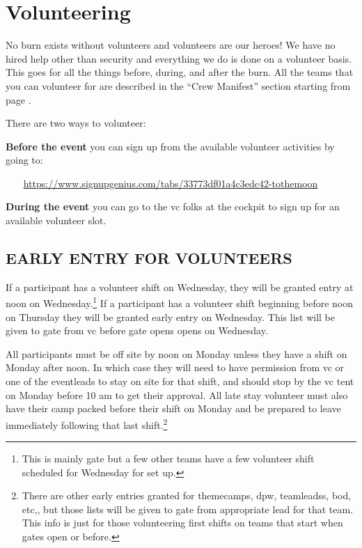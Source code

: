 %
%
%

\chapter{Volunteering}
\label{ch:volunteering}


No burn exists without volunteers and volunteers are our heroes! We have no hired help other than security and everything we do is done on a volunteer basis.  This goes for all the things before, during, and after the burn.  All the teams that you can volunteer for are described in the ``Crew Manifest'' section starting from page \pageref{ch:teams}.

There are two ways to volunteer:

\textbf{Before the event} you can sign up from the available volunteer activities by going to:

{\indent ~~~ \url{https://www.signupgenius.com/tabs/33773df01a4c3edc42-tothemoon} }

\textbf{During the event} you can go to the \gls{vc} folks at the \gls{cockpit} to sign up for an available volunteer slot.

\section*{EARLY ENTRY FOR VOLUNTEERS}

If a participant has a volunteer shift on Wednesday, they will be granted entry at noon on Wednesday.\footnote{This is mainly \gls{gate} but a few other teams have a few volunteer shift scheduled for Wednesday for set up.}  If a participant has a volunteer shift beginning before noon on Thursday they will be granted early entry on Wednesday.  This list will be given to \gls{gate} from \gls{vc} before \gls{gate} opens opens on Wednesday.

All participants must be off site by noon on Monday unless they have a shift on Monday after noon. In which case they will need to have permission from \gls{vc} or one of the \gls{eventleads} to stay on site for that shift, and should stop by the \gls{vc} tent on Monday before 10 am to get their approval. All late stay volunteer must also have their camp packed before their shift on Monday and be prepared to leave immediately following that last shift.\footnote{There are other early entries granted for \glspl{themecamp}, \gls{dpw}, \glspl{teamleads}, \gls{bod}, etc,,  but those lists will be given to \gls{gate} from appropriate lead for that team. This info is just for those volunteering first shifts on teams that start when gates open or before.}


